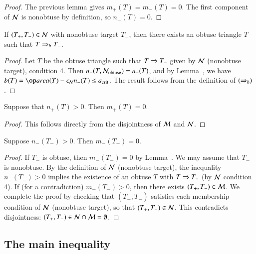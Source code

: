 \begin{proof} 
  The previous lemma gives $m_+(T)=m_-(T)=0$.  The first component of
  $\mathcal N$ is nonobtuse by definition, so $n_+(T)=0$.
\end{proof}

\begin{corollary} 
  If $(T_+,T_-)\in\mathcal N$ with nonobtuse target $T_-$, then there exists
  an obtuse triangle $T$ such that $T\Rightarrow_{b} T_-$.
\end{corollary}

\begin{proof} 
  Let $T$ be the obtuse triangle such that $T\Rightarrow T_-$ given by $\mathcal N$
  (nonobtuse target), condition 4.  Then $n_-(T,\mathcal N_{\text{obtuse}}) =
  n_-(T)$, and by Lemma~, we have $b(T) =
  \area(T)-\epsN n_-(T)\le\acrit$.  The result follows from the
  definition of $(\Rightarrow_{b})$.
\end{proof}


\begin{lemma}  
  Suppose that $n_+(T)>0$. Then $m_+(T)=0$.
\end{lemma}

\begin{proof} 
  This follows directly from the disjointness of $\mathcal M$ and $\mathcal N$.
\end{proof}

\begin{lemma}  
  Suppose $n_-(T_-)>0$.  Then $m_-(T_-)=0$.
\end{lemma}

\begin{proof}
  If $T_-$ is obtuse, then $m_-(T_-)=0$ by Lemma~.
  We may assume that $T_-$ is nonobtuse.  By the definition of $\mathcal N$
  (nonobtuse target), the inequality $n_-(T_-) >0$ implies the
  existence of an obtuse $T$ with $T\Rightarrow T_-$ (by $\mathcal N$ condition 4).
  If (for a contradiction) $m_-(T_-)>0$, then there exists
  $(T_+,T_-)\in\mathcal M$.  We complete the proof by checking that
  $(T_+,T_-)$ satisfies each membership condition of $\mathcal N$ (nonobtuse
  target), so that $(T_+,T_-)\in\mathcal N$.  This contradicts disjointness:
  $(T_+,T_-)\in \mathcal N\cap\mathcal M = \emptyset$.
\end{proof}



\subsection{The main inequality}

